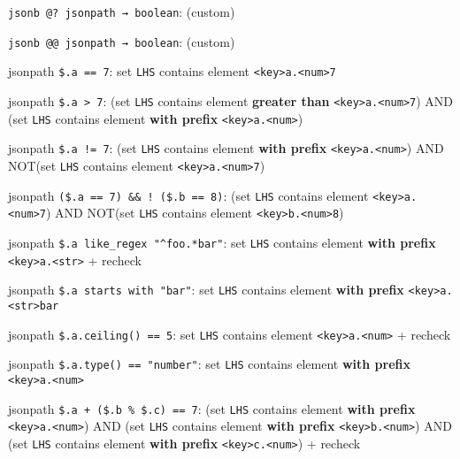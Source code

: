 \begin{oparts}
\item
  \texttt{jsonb\ @?\ jsonpath\ →\ boolean}: (custom)
\item
  \texttt{jsonb\ @@\ jsonpath\ →\ boolean}: (custom)

  \begin{oparts}
  \item
    jsonpath \texttt{\$.a\ ==\ 7}: set \texttt{LHS} contains element
    \texttt{\textless{}key\textgreater{}a.\textless{}num\textgreater{}7}
  \item
    jsonpath \texttt{\$.a\ \textgreater{}\ 7}: (set \texttt{LHS}
    contains element \textbf{greater than}
    \texttt{\textless{}key\textgreater{}a.\textless{}num\textgreater{}7})
    AND (set \texttt{LHS} contains element \textbf{with prefix}
    \texttt{\textless{}key\textgreater{}a.\textless{}num\textgreater{}})
  \item
    jsonpath \texttt{\$.a\ !=\ 7}: (set \texttt{LHS} contains element
    \textbf{with prefix}
    \texttt{\textless{}key\textgreater{}a.\textless{}num\textgreater{}})
    AND NOT(set \texttt{LHS} contains element
    \texttt{\textless{}key\textgreater{}a.\textless{}num\textgreater{}7})
  \item
    jsonpath \texttt{(\$.a\ ==\ 7)\ \&\&\ !\ (\$.b\ ==\ 8)}: (set
    \texttt{LHS} contains element
    \texttt{\textless{}key\textgreater{}a.\textless{}num\textgreater{}7})
    AND NOT(set \texttt{LHS} contains element
    \texttt{\textless{}key\textgreater{}b.\textless{}num\textgreater{}8})
  \item
    jsonpath \texttt{\$.a\ like\_regex\ "\^{}foo.*bar"}: set
    \texttt{LHS} contains element \textbf{with prefix}
    \texttt{\textless{}key\textgreater{}a.\textless{}str\textgreater{}}
    + recheck
  \item
    jsonpath \texttt{\$.a\ starts\ with\ "bar"}: set \texttt{LHS}
    contains element \textbf{with prefix}
    \texttt{\textless{}key\textgreater{}a.\textless{}str\textgreater{}bar}
  \item
    jsonpath \texttt{\$.a.ceiling()\ ==\ 5}: set \texttt{LHS} contains
    element
    \texttt{\textless{}key\textgreater{}a.\textless{}num\textgreater{}}
    + recheck
  \item
    jsonpath \texttt{\$.a.type()\ ==\ "number"}: set \texttt{LHS}
    contains element \textbf{with prefix}
    \texttt{\textless{}key\textgreater{}a.\textless{}num\textgreater{}}
  \item
    jsonpath \texttt{\$.a\ +\ (\$.b\ \%\ \$.c)\ ==\ 7}: (set
    \texttt{LHS} contains element \textbf{with prefix}
    \texttt{\textless{}key\textgreater{}a.\textless{}num\textgreater{}})
    AND (set \texttt{LHS} contains element \textbf{with prefix}
    \texttt{\textless{}key\textgreater{}b.\textless{}num\textgreater{}})
    AND (set \texttt{LHS} contains element \textbf{with prefix}
    \texttt{\textless{}key\textgreater{}c.\textless{}num\textgreater{}})
    + recheck
  \end{oparts}
\end{oparts}
